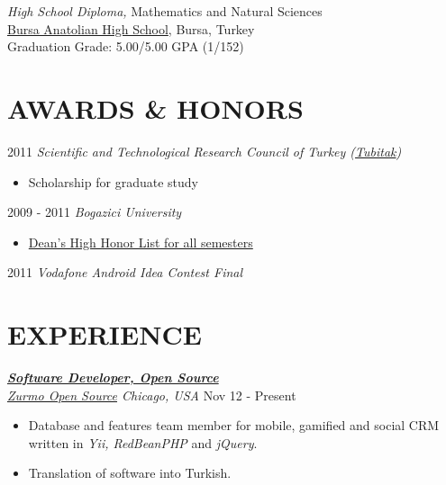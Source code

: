 \documentclass[line, margin]{res}
\begin{document}
\begin{resume}
	{\sl High School Diploma,} Mathematics and Natural Sciences \\
	\href{http://www.bursaanadolulisesi.k12.tr/}{Bursa Anatolian High School}, Bursa, Turkey \\
	Graduation Grade: 5.00/5.00 GPA (1/152)               

\vspace{-0.2cm}

\section{AWARDS \& HONORS}
	2011 {\sl Scientific and Technological Research Council of Turkey 						(\href{http://www.tubitak.gov.tr/en/ot/10/}{Tubitak})} \\
	\vspace{-.3cm}				
	\begin{itemize} 
		\item Scholarship for graduate study
	\end{itemize}
	
	\vspace{-0.4cm}			
	2009 - 2011 {\sl Bogazici University }
	\begin{itemize} \itemsep -2pt
		\item \href{http://www.eng.boun.edu.tr/current_students.html}{Dean's High Honor List for all semesters}	
	\end{itemize}

  \vspace{-0.4cm}
	2011 {\sl Vodafone Android Idea Contest Final} \\
 
\vspace{-0.4cm} 

\section{EXPERIENCE}

  {\sl \textbf{\href{https://bitbucket.org/zurmo/}{Software Developer, Open Source}} \\ \href{http://zurmo.org}{Zurmo Open Source} Chicago, USA} \hfill Nov 12 - Present \\
  \vspace{-0.3cm}
  \begin{itemize}
    \item Database and features team member for mobile, gamified and social CRM written in   \textit{Yii, RedBeanPHP} and \textit{jQuery}.
    \item Translation of software into Turkish.
  \end{itemize}


\end{resume}
\end{document}
